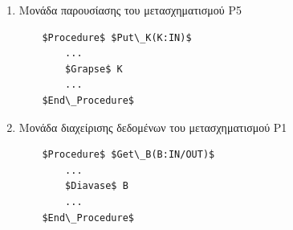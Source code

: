 \documentclass[12pt]{article}
\begin{document}
\begin{enumerate}
\begin{enumerate}[label*=\roman*]
	\item Μονάδα παρουσίασης του μετασχηματισμού Ρ5
	\begin{lstlisting}
	$Procedure$ $Put\_K(K:IN)$
		...
		$Grapse$ K
		...
	$End\_Procedure$
	\end{lstlisting}
	
	\item Μονάδα διαχείρισης δεδομένων του μετασχηματισμού Ρ1
	\begin{lstlisting}
	$Procedure$ $Get\_B(B:IN/OUT)$
		...
		$Diavase$ B
		...
	$End\_Procedure$
	\end{lstlisting}
\end{enumerate}
\end{enumerate}
\end{document}
